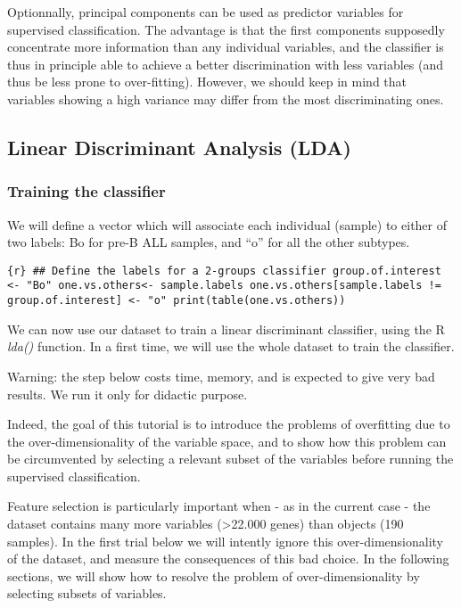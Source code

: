 Optionnally, principal components can be used as predictor variables for
supervised classification. The advantage is that the first components
supposedly concentrate more information than any individual variables,
and the classifier is thus in principle able to achieve a better
discrimination with less variables (and thus be less prone to
over-fitting). However, we should keep in mind that variables showing a
high variance may differ from the most discriminating ones.

\subsection{Linear Discriminant Analysis
(LDA)}\label{linear-discriminant-analysis-lda}

\subsubsection{Training the classifier}\label{training-the-classifier}

We will define a vector which will associate each individual (sample) to
either of two labels: Bo for pre-B ALL samples, and ``o'' for all the
other subtypes.

\texttt{\{r\} \#\# Define the labels for a 2-groups classifier group.of.interest \textless{}- "Bo" one.vs.others\textless{}- sample.labels one.vs.others{[}sample.labels != group.of.interest{]} \textless{}- "o" print(table(one.vs.others))}

We can now use our dataset to train a linear discriminant classifier,
using the R \emph{lda()} function. In a first time, we will use the
whole dataset to train the classifier.

Warning: the step below costs time, memory, and is expected to give very
bad results. We run it only for didactic purpose.

Indeed, the goal of this tutorial is to introduce the problems of
{overfitting} due to the {over-dimensionality} of the variable space,
and to show how this problem can be circumvented by selecting a relevant
subset of the variables before running the supervised classification.

Feature selection is particularly important when - as in the current
case - the dataset contains many more variables (\textgreater{}22.000
genes) than objects (190 samples). In the first trial below we will
intently ignore this over-dimensionality of the dataset, and measure the
consequences of this bad choice. In the following sections, we will show
how to resolve the problem of over-dimensionality by selecting subsets
of variables.

